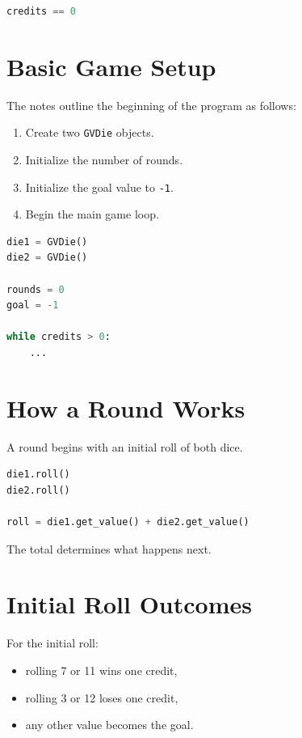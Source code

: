 \documentclass[11pt]{article}
\begin{document}
\begin{lstlisting}[language=Python]
credits == 0
\end{lstlisting}

\section{Basic Game Setup}

The notes outline the beginning of the program as follows:

\begin{enumerate}
    \item Create two \texttt{GVDie} objects.
    \item Initialize the number of rounds.
    \item Initialize the goal value to \texttt{-1}.
    \item Begin the main game loop.
\end{enumerate}

\begin{lstlisting}[language=Python]
die1 = GVDie()
die2 = GVDie()

rounds = 0
goal = -1

while credits > 0:
    ...
\end{lstlisting}

\section{How a Round Works}

A round begins with an initial roll of both dice.

\begin{lstlisting}[language=Python]
die1.roll()
die2.roll()

roll = die1.get_value() + die2.get_value()
\end{lstlisting}

The total determines what happens next.

\section{Initial Roll Outcomes}

For the initial roll:

\begin{itemize}
    \item rolling 7 or 11 wins one credit,
    \item rolling 3 or 12 loses one credit,
    \item any other value becomes the goal.
\end{itemize}
\end{document}
